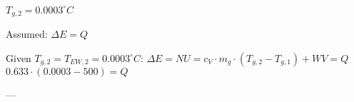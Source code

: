\( T_{g,2} = 0.0003^\circ C \)  

Assumed:  
\( \Delta E = Q \)  

Given \( T_{g,2} = T_{EW,2} = 0.0003^\circ C \):  
\( \Delta E = NU = c_V \cdot m_g \cdot (T_{g,2} - T_{g,1}) + WV = Q \)  
\( 0.633 \cdot (0.0003 - 500) = Q \)  

---